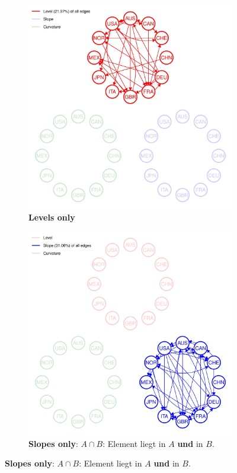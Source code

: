 \documentclass{article}
\begin{document}
\begin{figure}[H]
  \begin{subfigure}[t]{.4\textwidth}
    \centering
    \includegraphics[width=\linewidth]{All_plot_onlylevel2004-07-01_2019-12-31_0.01-page-001}
    \caption{\textbf{Levels only}}
  \end{subfigure}
  \hfill
  \begin{subfigure}[t]{.4\textwidth}
    \centering
    \includegraphics[width=\linewidth]{All_plot_onlyslope_2004-07-01_2019-12-31_0.01-page-001}
    \caption{\textbf{Slopes only}: $A \cap B$: Element liegt in $A$ \textbf{und} in $B$.}
  \end{subfigure}


\end{figure}
\end{document}
